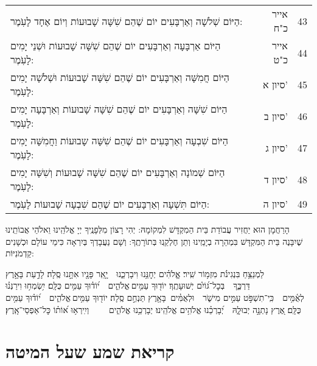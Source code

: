 \documentclass[twoside, openany, parskip=half, 11pt]{book}
\begin{document}
\begin{scriptsize}
\begin{longtable}{p{} | r | l}
	הַיּוֹם שְׁלֹשָׁה וְאַרְבָּעִים יוֹם שֶׁהֵם שִׁשָּׁה שָׁבוּעוֹת וְיוֹם אֶחָד לָעֹֽמֶר:&אייר כ"ח & 43 \\
	הַיּוֹם אַרְבָּעָה וְאַרְבָּעִים יוֹם שֶׁהֵם שִׁשָּׁה שָׁבוּעוֹת וּשְׁנֵי יָמִים לָעֹֽמֶר:&אייר כ"ט & 44 \\
	הַיּוֹם חֲמִשָּׁה וְאַרְבָּעִים יוֹם שֶׁהֵם שִׁשָּׁה שָׁבוּעוֹת וּשְׁלֹשָׁה יָמִים לָעֹֽמֶר: &סיון א' & 45 \\
 	הַיּוֹם שִׁשָּׁה וְאַרְבָּעִים יוֹם שֶׁהֵם שִׁשָּׁה שָׁבוּעוֹת וְאַרְבָּעָה יָמִים לָעֹֽמֶר:&סיון ב' & 46 \\
 הַיּוֹם שִׁבְעָה וְאַרְבָּעִים יוֹם שֶׁהֵם שִׁשָּׁה שָבוּעוֹת וַחֲמִשָּׁה יָמִים לָעֹֽמֶר: &סיון ג' & 47\\
 	הַיּוֹם שְׁמוֹנָה וְאַרְבָּעִים יוֹם שֶׁהֵם שִׁשָּׁה שָׁבוּעוֹת וְשִׁשָּׁה יָמִים לָעֹֽמֶר:&סיון ד' & 48 \\
	הַיּוֹם תִּשְׁעָה וְאַרְבָּעִים יוֹם שֶׁהֵם שִׁבְעָה שָׁבוּעוֹת לָעֹֽמֶר:&סיון ה' &49 \\

\end{longtable}
\end{scriptsize}

\enlargethispage{\baselineskip}

הָרַחֲמָן הוּא יַחֲזִיר עֲבוֹדַת בֵּית הַמִקְדָּשׁ לִמְקוֹמָהּ: 
יְהִי רָצוֹן מִלְּפָנֶֽיךָ יְיָ אֱלֹהֵֽינוּ וֵאלֹהֵי אֲבוֹתֵֽינוּ שֶׁיִבָּנֶה בֵּית הַמִּקְדָּשׁ בִּמְהֵרָה בְיָמֵֽינוּ וְתֵן חֶלְקֵֽנוּ בְּתוֹרָתֶֽךָ: וְשָׁם נַעֲבָדְךָ בְּיִרְאָה כִּימֵי עוֹלָם וּכְשָׁנִים קַדְמֹנִיּוֹת: 


 לַמְנַצֵּ֥חַ
  בִּנְגִינֹ֗ת מִזְמ֥וֹר שִֽׁיר׃ אֱֽלֹהִ֗ים יְחׇנֵּ֥נוּ וִיבָרְכֵ֑נוּ יָ֤אֵֽר פָּנָ֖יו אִתָּ֣נוּ סֶֽלָה׃ לָדַ֣עַת בָּאָ֣רֶץ דַּרְכֶּ֑ךָ בְּכׇל־גּ֝וֹיִ֗ם יְשׁוּעָתֶֽךָ׃ יוֹד֖וּךָ עַמִּ֥ים אֱלֹהִ֑ים י֝וֹד֗וּךָ עַמִּ֥ים כֻּלָּֽם׃ יִ֥שְׂמְח֥וּ וִירַנְּנ֗וּ לְאֻ֫מִּ֥ים כִּֽי־תִשְׁפֹּ֣ט עַמִּ֣ים מִישֹׁ֑ר וּלְאֻמִּ֓ים  בָּאָ֖רֶץ תַּנְחֵ֣ם סֶֽלָה׃ יוֹד֖וּךָ עַמִּ֥ים אֱלֹהִ֑ים י֝וֹד֗וּךָ עַמִּ֥ים כֻּלָּֽם׃ אֶ֭רֶץ נָתְנָ֣ה יְבוּלָ֑הּ יְ֝בָרְכֵ֗נוּ אֱלֹהִ֥ים אֱלֹהֵֽינוּ׃ יְבָרְכֵ֥נוּ אֱלֹהִ֑ים   וְיִֽירְא֥וּ א֝וֹת֗וֹ כׇּל־אַפְסֵי־אָֽרֶץ׃

\chapter[קריאת שמע שעל המיטה]{ קריאת שמע שעל המיטה }

\shema

\veahavta
\end{document}
